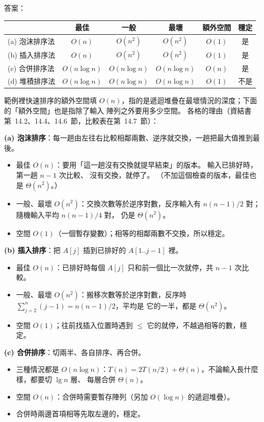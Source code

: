 \begin{pastsoln}
答案：
\begin{center}
\small
\begin{tabular}{lccccc}
\toprule
 & 最佳 & 一般 & 最壞 & 額外空間 & 穩定 \\
\midrule
(a) 泡沫排序法 & $O(n)$ & $O(n^2)$ & $O(n^2)$ & $O(1)$ & 是 \\
(b) 插入排序法 & $O(n)$ & $O(n^2)$ & $O(n^2)$ & $O(1)$ & 是 \\
(c) 合併排序法 & $O(n \log n)$ & $O(n \log n)$ & $O(n \log n)$ & $O(n)$ & 是 \\
(d) 堆積排序法 & $O(n \log n)$ & $O(n \log n)$ & $O(n \log n)$ & $O(1)$ & 不是 \\
\bottomrule
\end{tabular}
\end{center}
範例裡快速排序的額外空間填 $O(n)$，指的是遞迴堆疊在最壞情況的深度；下面的「額外空間」也是指除了輸入
陣列之外要用多少空間。 各格的理由（資結書第~14.2、14.4、14.6~節，比較表在第~14.7~節）：

\textbf{(a) 泡沫排序}：每一趟由左往右比較相鄰兩數、逆序就交換，一趟把最大值推到最後。
\begin{itemize}
\item 最佳 $O(n)$：要用「這一趟沒有交換就提早結束」的版本。 輸入已排好時，第一趟 $n - 1$ 次比較、
沒有交換，就停了。 （不加這個檢查的版本，最佳也是 $\Theta(n^2)$。）
\item 一般、最壞 $O(n^2)$：交換次數等於逆序對數，反序輸入有 $n(n-1)/2$ 對；隨機輸入平均 $n(n-1)/4$ 對，
仍是 $\Theta(n^2)$。
\item 空間 $O(1)$（一個暫存變數）；相等的相鄰兩數不交換，所以穩定。
\end{itemize}

\textbf{(b) 插入排序}：把 $A[j]$ 插到已排好的 $A[1..j-1]$ 裡。
\begin{itemize}
\item 最佳 $O(n)$：已排好時每個 $A[j]$ 只和前一個比一次就停，共 $n - 1$ 次比較。
\item 一般、最壞 $O(n^2)$：搬移次數等於逆序對數，反序時 $\sum_{j=2}^{n} (j - 1) = n(n-1)/2$，平均是
它的一半，都是 $\Theta(n^2)$。
\item 空間 $O(1)$；往前找插入位置時遇到 $\le$ 它的就停，不越過相等的數，穩定。
\end{itemize}

\textbf{(c) 合併排序}：切兩半、各自排序、再合併。
\begin{itemize}
\item 三種情況都是 $O(n \log n)$：$T(n) = 2T(n/2) + \Theta(n)$，不論輸入長什麼樣，都要切 $\lg n$ 層、
每層合併 $\Theta(n)$。
\item 空間 $O(n)$：合併時需要暫存陣列（另加 $O(\log n)$ 的遞迴堆疊）。
\item 合併時兩邊首項相等先取左邊的，穩定。
\end{itemize}


\end{pastsoln}
